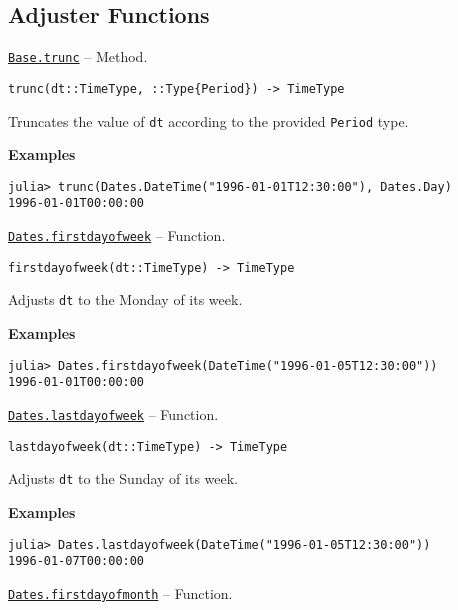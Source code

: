 \hypertarget{8847679603742752911}{}


\subsection{Adjuster Functions}


\hypertarget{173413331178974124}{} 
\hyperlink{173413331178974124}{\texttt{Base.trunc}}  -- {Method.}

\begin{adjustwidth}{2em}{0pt}


\begin{verbatim}
trunc(dt::TimeType, ::Type{Period}) -> TimeType
\end{verbatim}

Truncates the value of \texttt{dt} according to the provided \texttt{Period} type.

\textbf{Examples}


\begin{verbatim}
julia> trunc(Dates.DateTime("1996-01-01T12:30:00"), Dates.Day)
1996-01-01T00:00:00
\end{verbatim}



\end{adjustwidth}
\hypertarget{725369720992290901}{} 
\hyperlink{725369720992290901}{\texttt{Dates.firstdayofweek}}  -- {Function.}

\begin{adjustwidth}{2em}{0pt}


\begin{verbatim}
firstdayofweek(dt::TimeType) -> TimeType
\end{verbatim}

Adjusts \texttt{dt} to the Monday of its week.

\textbf{Examples}


\begin{verbatim}
julia> Dates.firstdayofweek(DateTime("1996-01-05T12:30:00"))
1996-01-01T00:00:00
\end{verbatim}



\end{adjustwidth}
\hypertarget{15555713849502356755}{} 
\hyperlink{15555713849502356755}{\texttt{Dates.lastdayofweek}}  -- {Function.}

\begin{adjustwidth}{2em}{0pt}


\begin{verbatim}
lastdayofweek(dt::TimeType) -> TimeType
\end{verbatim}

Adjusts \texttt{dt} to the Sunday of its week.

\textbf{Examples}


\begin{verbatim}
julia> Dates.lastdayofweek(DateTime("1996-01-05T12:30:00"))
1996-01-07T00:00:00
\end{verbatim}



\end{adjustwidth}
\hypertarget{944292496394173921}{} 
\hyperlink{944292496394173921}{\texttt{Dates.firstdayofmonth}}  -- {Function.}

